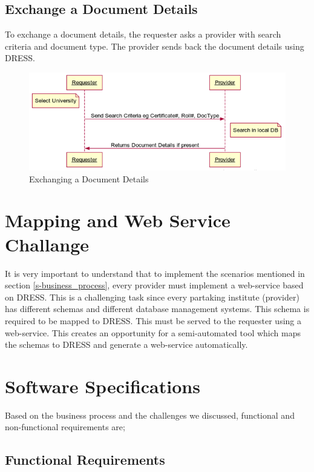 \documentclass[12pt,a4paper,oneside]{book}
\begin{document}
    \subsection{Exchange a Document Details}
    To exchange a document details, the requester asks a provider with search criteria and document type. The provider sends back the document details using DRESS.

\begin{figure}[!htp]
  \centering
  \includegraphics[width=14cm]{sq_exchange_doc.png}
  \caption{Exchanging a Document Details}
  \label{fig:sq_exchange_doc}
\end{figure}

\section{Mapping and Web Service Challange}

It is very important to understand that to implement the scenarios mentioned in section \ref{s-business_process}, every provider must implement a web-service based on DRESS. This is a challenging task since every partaking institute (provider) has different schemas and different database management systems. This schema is required to be mapped to DRESS. This must be served to the requester using a web-service. This creates an opportunity for a semi-automated tool which maps the schemas to DRESS and generate a web-service automatically.

\section{Software Specifications}\label{s-softspecs}
Based on the business process and the challenges we discussed, functional and non-functional requirements are;

    \subsection{Functional Requirements}
    
\end{document}
